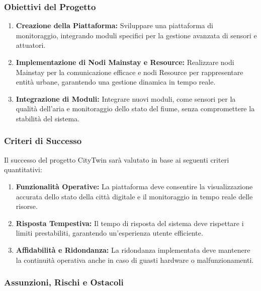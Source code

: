 \subsubsection{Obiettivi del Progetto}

\begin{enumerate}
    \item \textbf{Creazione della Piattaforma:} Sviluppare una piattaforma di monitoraggio, integrando moduli specifici per la gestione avanzata di sensori e attuatori.

    \item \textbf{Implementazione di Nodi Mainstay e Resource:} Realizzare nodi Mainstay per la comunicazione efficace e nodi Resource per rappresentare entità urbane, garantendo una gestione dinamica in tempo reale.

    \item \textbf{Integrazione di Moduli:} Integrare nuovi moduli, come sensori per la qualità dell'aria e monitoraggio dello stato del fiume, senza compromettere la stabilità del sistema.
\end{enumerate}

\subsubsection{Criteri di Successo}

Il successo del progetto CityTwin sarà valutato in base ai seguenti criteri quantitativi:

\begin{enumerate}
    \item \textbf{Funzionalità Operative:} La piattaforma deve consentire la visualizzazione accurata dello stato della città digitale e il monitoraggio in tempo reale delle risorse.

    \item \textbf{Risposta Tempestiva:} Il tempo di risposta del sistema deve rispettare i limiti prestabiliti, garantendo un'esperienza utente efficiente.

    \item \textbf{Affidabilità e Ridondanza:} La ridondanza implementata deve mantenere la continuità operativa anche in caso di guasti hardware o malfunzionamenti.
\end{enumerate}

\subsubsection{Assunzioni, Rischi e Ostacoli}

